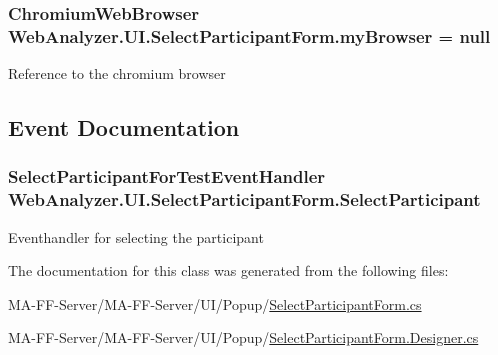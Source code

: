 \subsubsection[{my\+Browser}]{\setlength{\rightskip}{0pt plus 5cm}Chromium\+Web\+Browser Web\+Analyzer.\+U\+I.\+Select\+Participant\+Form.\+my\+Browser = null\hspace{0.3cm}{\ttfamily [private]}}\label{class_web_analyzer_1_1_u_i_1_1_select_participant_form_af929c5af133ce3c9fd5b3f4a35ca5d4d}


Reference to the chromium browser 



\subsection{Event Documentation}
\hypertarget{class_web_analyzer_1_1_u_i_1_1_select_participant_form_af1734ad8760e4e4f42579efafcb7299d}{}
\subsubsection[{Select\+Participant}]{\setlength{\rightskip}{0pt plus 5cm}Select\+Participant\+For\+Test\+Event\+Handler Web\+Analyzer.\+U\+I.\+Select\+Participant\+Form.\+Select\+Participant}\label{class_web_analyzer_1_1_u_i_1_1_select_participant_form_af1734ad8760e4e4f42579efafcb7299d}


Eventhandler for selecting the participant 



The documentation for this class was generated from the following files\+:\begin{DoxyCompactItemize}
\item 
M\+A-\/\+F\+F-\/\+Server/\+M\+A-\/\+F\+F-\/\+Server/\+U\+I/\+Popup/\hyperlink{_select_participant_form_8cs}{Select\+Participant\+Form.\+cs}\item 
M\+A-\/\+F\+F-\/\+Server/\+M\+A-\/\+F\+F-\/\+Server/\+U\+I/\+Popup/\hyperlink{_select_participant_form_8_designer_8cs}{Select\+Participant\+Form.\+Designer.\+cs}\end{DoxyCompactItemize}
